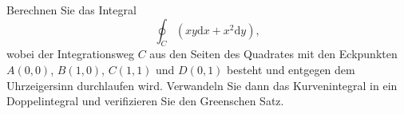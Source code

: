 \begin{atiTask}[
  title = Verifikation des Greenschen Satzes
]
  \providecommand{\D}{\mathrm{d}}
Berechnen Sie das Integral
\[
\oint_C \left(xy\D x+ x^2\D y\right),
\]
wobei der Integrationsweg $C$ aus den Seiten des Quadrates mit den Eckpunkten $A(0,0)$, $B(1,0)$, $C(1,1)$ und $D(0,1)$ besteht und entgegen dem Uhrzeigersinn durchlaufen wird. Verwandeln Sie dann das Kurvenintegral in ein Doppelintegral und verifizieren Sie den Greenschen Satz.

\end{atiTask}
\begin{atiSolution}
	
\end{atiSolution}